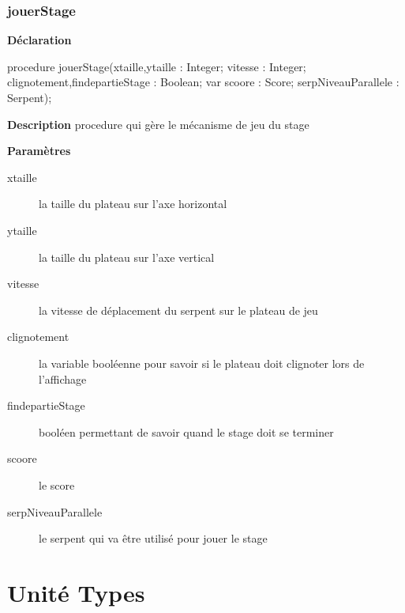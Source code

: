 \documentclass{report}
\newif\ifpdf
\begin{document}
\subsection*{jouerStage}
\fi
\label{Stage-jouerStage}
\begin{list}{}{
\setlength{\itemindent}{0cm}
\setlength{\listparindent}{0cm}
\setlength{\leftmargin}{\evensidemargin}
\addtolength{\leftmargin}{\tmplength}
\settowidth{\labelsep}{X}
\addtolength{\leftmargin}{\labelsep}
\setlength{\labelwidth}{\tmplength}
}
\item[\textbf{Déclaration}\hfill]
\ifpdf
\begin{flushleft}
\fi
\begin{ttfamily}
procedure jouerStage(xtaille,ytaille : Integer; vitesse : Integer; clignotement,findepartieStage : Boolean; var scoore : Score; serpNiveauParallele : Serpent);\end{ttfamily}

\ifpdf
\end{flushleft}
\fi

\par
\item[\textbf{Description}]
procedure qui gère le mécanisme de jeu du stage       \par
\item[\textbf{Paramètres}]
\begin{description}
\item[xtaille] la taille du plateau sur l'axe horizontal
\item[ytaille] la taille du plateau sur l'axe vertical
\item[vitesse] la vitesse de déplacement du serpent sur le plateau de jeu
\item[clignotement] la variable booléenne pour savoir si le plateau doit clignoter lors de l'affichage
\item[findepartieStage] booléen permettant de savoir quand le stage doit se terminer
\item[scoore] le score
\item[serpNiveauParallele] le serpent qui va être utilisé pour jouer le stage
\end{description}


\end{list}
\chapter{Unité Types}
\label{Types}
\end{document}

